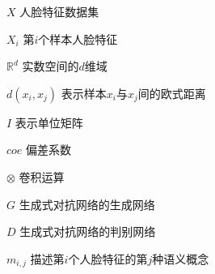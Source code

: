 \begin{denotation}

\item[$X$] 人脸特征数据集
\item[$X_i$] 第$i$个样本人脸特征
\item[$\mathbb{R}^{d}$] 实数空间的$d$维域
\item[$d(x_i,x_j)$] 表示样本$x_i$与$x_j$间的欧式距离
\item[$I$] 表示单位矩阵
\item[$coe$] 偏差系数
\item[$\otimes$] 卷积运算
\item[$G$] 生成式对抗网络的生成网络
\item[$D$] 生成式对抗网络的判别网络
\item[$m_{i,j}$] 描述第$i$个人脸特征的第$j$种语义概念


\end{denotation}
